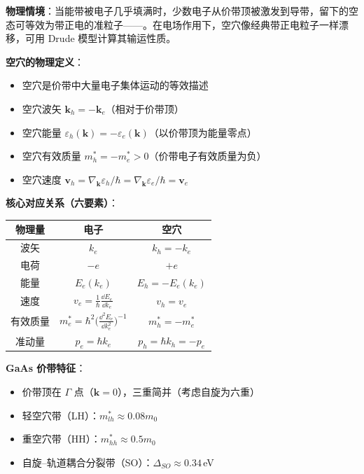 \begin{modelbox}[模型：从空穴定义到半导体输运]
\textbf{物理情境}：当能带被电子几乎填满时，少数电子从价带顶被激发到导带，留下的空态可等效为带正电的准粒子——。在电场作用下，空穴像经典带正电粒子一样漂移，可用 Drude 模型计算其输运性质。

\textbf{空穴的物理定义}：
\begin{itemize}[nosep]
    \item 空穴是价带中大量电子集体运动的等效描述
    \item 空穴波矢 $\mathbf{k}_h=-\mathbf{k}_e$（相对于价带顶）
    \item 空穴能量 $\varepsilon_h(\mathbf{k})=-\varepsilon_e(\mathbf{k})$（以价带顶为能量零点）
    \item 空穴有效质量 $m_h^*=-m_e^*>0$（价带电子有效质量为负）
    \item 空穴速度 $\mathbf{v}_h=\nabla_{\mathbf{k}}\varepsilon_h/\hbar=\nabla_{\mathbf{k}}\varepsilon_e/\hbar=\mathbf{v}_e$
\end{itemize}

\textbf{核心对应关系（六要素）}：
\begin{center}
\begin{tabular}{ccc}
\toprule
\textbf{物理量} & \textbf{电子} & \textbf{空穴} \\
\midrule
波矢 & $k_e$ & $k_h=-k_e$ \\
电荷 & $-e$ & $+e$ \\
能量 & $E_e(k_e)$ & $E_h=-E_e(k_e)$ \\
速度 & $v_e=\frac{1}{\hbar}\frac{\dd E_e}{\dd k_e}$ & $v_h=v_e$ \\
有效质量 & $m_e^*=\hbar^2\bigl(\frac{\dd^2E_e}{\dd k_e^2}\bigr)^{-1}$ & $m_h^*=-m_e^*$ \\
准动量 & $p_e=\hbar k_e$ & $p_h=\hbar k_h=-p_e$ \\
\bottomrule
\end{tabular}
\end{center}

\textbf{GaAs 价带特征}：
\begin{itemize}[nosep]
    \item 价带顶在 $\Gamma$ 点（$\mathbf{k}=0$），三重简并（考虑自旋为六重）
    \item 轻空穴带（LH）：$m_{lh}^*\approx0.08m_0$
    \item 重空穴带（HH）：$m_{hh}^*\approx0.5m_0$
    \item 自旋--轨道耦合分裂带（SO）：$\Delta_{SO}\approx0.34\,$eV
\end{itemize}
\end{modelbox}

